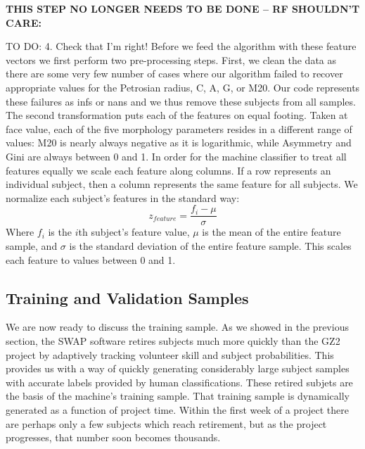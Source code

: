 \documentclass[twocolumn]{aastex6}
\begin{document}

\textbf{THIS STEP NO LONGER NEEDS TO BE DONE -- RF SHOULDN'T CARE:}

{\color{red} TO DO: 4. Check that I'm right! }
Before we feed the algorithm with these feature vectors we first perform two pre-processing steps. First, we clean the data as there are some very few number of cases where our algorithm failed to recover appropriate values for the Petrosian radius, C, A, G, or M20. Our code represents these failures as infs or nans and we thus remove these subjects from all samples.  The second transformation puts each of the features on equal footing. Taken at face value, each of the five morphology parameters resides in a different range of values:  M20 is nearly always negative as it is logarithmic, while Asymmetry and Gini are always between 0 and 1.  In order for the machine classifier to treat all features equally we scale each feature along columns. If a row represents an individual subject, then a column represents the same feature for all subjects. We normalize each subject's features in the standard way: 
\begin{equation}
z_{feature} = \frac{f_i - \mu}{\sigma}
\end{equation} 
Where $f_i$ is the $i$th subject's feature value, $\mu$ is the mean of the entire feature sample, and $\sigma$ is the standard deviation of the entire feature sample. This scales each feature to values between 0 and 1. 


\subsection{Training and Validation Samples}
We are now ready to discuss the training sample. As we showed in the previous 
section, the SWAP software retires subjects much more quickly than the GZ2 project
by adaptively tracking volunteer skill and subject probabilities. This provides us
with a way of quickly generating considerably large subject samples with accurate
labels provided by human classifications. These retired subjets are the basis of the 
machine's training sample. That training sample is dynamically generated as a function
of project time. Within the first week of a project there are perhaps only a few 
subjects which reach retirement, but as the project progresses, that number 
soon becomes thousands.  
\end{document}
